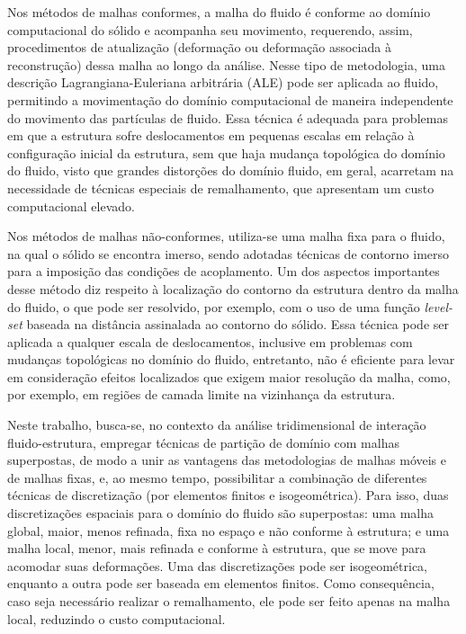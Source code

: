 Nos métodos de malhas conformes, a malha do fluido é conforme ao domínio computacional do sólido e acompanha seu movimento, requerendo, assim, procedimentos de atualização (deformação ou deformação associada à reconstrução) dessa malha ao longo da análise. Nesse tipo de metodologia, uma descrição Lagrangiana-Euleriana arbitrária (ALE) pode ser aplicada ao fluido, permitindo a movimentação do domínio computacional de maneira independente do movimento das partículas de fluido. Essa técnica é adequada para problemas em que a estrutura sofre deslocamentos em pequenas escalas em relação à configuração inicial da estrutura, sem que haja mudança topológica do domínio do fluido, visto que grandes distorções do domínio fluido, em geral, acarretam na necessidade de técnicas especiais de remalhamento, que apresentam um custo computacional elevado.

Nos métodos de malhas não-conformes, utiliza-se uma malha fixa para o fluido, na qual o sólido se encontra imerso, sendo adotadas técnicas de contorno imerso para a imposição das condições de acoplamento. Um dos aspectos importantes desse método diz respeito à localização do contorno da estrutura dentro da malha do fluido, o que pode ser resolvido, por exemplo, com o uso de uma função \textit{level-set} baseada na distância assinalada ao contorno do sólido. Essa técnica pode ser aplicada a qualquer escala de deslocamentos, inclusive em problemas com mudanças topológicas no domínio do fluido, entretanto, não é eficiente para levar em consideração efeitos localizados que exigem maior resolução da malha, como, por exemplo, em regiões de camada limite na vizinhança da estrutura.

Neste trabalho, busca-se, no contexto da análise tridimensional de interação fluido-estrutura, empregar técnicas de partição de domínio com malhas superpostas, de modo a unir as vantagens das metodologias de malhas móveis e de malhas fixas, e, ao mesmo tempo, possibilitar a combinação de diferentes técnicas de discretização (por elementos finitos e isogeométrica). Para isso, duas discretizações espaciais para o domínio do fluido são superpostas: uma malha global, maior, menos refinada, fixa no espaço e não conforme à estrutura; e uma malha local, menor, mais refinada e conforme à estrutura, que se move para acomodar suas deformações. Uma das discretizações pode ser isogeométrica, enquanto a outra pode ser baseada em elementos finitos. Como consequência, caso seja necessário realizar o remalhamento, ele pode ser feito apenas na malha local, reduzindo o custo computacional. 


